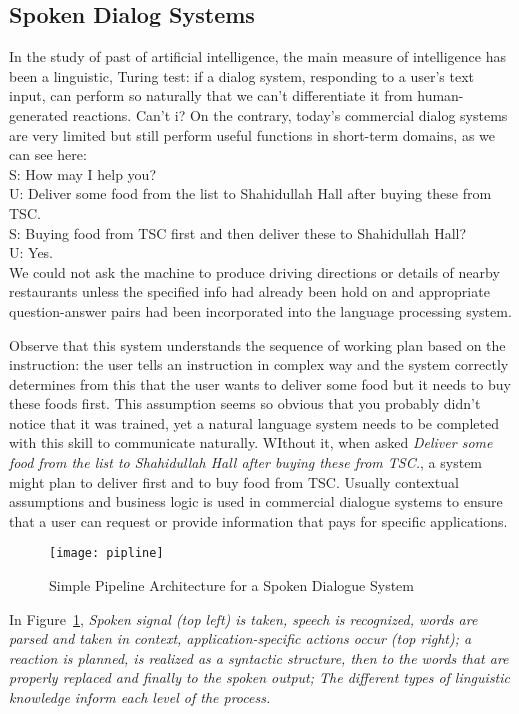 \subsection{Spoken Dialog Systems}
In the study of past of artificial intelligence, the main measure of intelligence has been a linguistic, Turing test: if a dialog system, responding to a user's text input, can perform so naturally that we can't differentiate it from human-generated reactions. Can't i? On the contrary, today's commercial dialog systems are very limited but still perform useful functions in short-term domains, as we can see here:\\
S: How may I help you?\\
U: Deliver some food from the list to Shahidullah Hall after buying these from TSC.\\
S: Buying food from TSC first and then deliver these to Shahidullah Hall?\\
U: Yes.\\

We could not ask the machine to produce driving directions or details of nearby restaurants unless the specified info had already been hold on and appropriate question-answer pairs had been incorporated into the language processing system.

Observe that this system understands the sequence of working plan based on the instruction: the user tells an instruction in complex way and the system correctly determines from this that the user wants to deliver some food but it needs to buy these foods first. This assumption seems so obvious that you probably didn't notice that it was trained, yet a natural language system needs to be completed with this skill to communicate naturally. WIthout it, when asked \emph{Deliver some food from the list to Shahidullah Hall after buying these from TSC.}, a system might plan to deliver first and to buy food from TSC.
Usually contextual assumptions and business logic is used in commercial dialogue systems to ensure that a user can request or provide information that pays for specific applications.

\begin{figure}
    \centering
    \texttt{[image: pipline]}
    \caption{Simple Pipeline Architecture for a Spoken Dialogue System\cite{NLPbook}}
    \label{fig:1}
\end{figure}

In Figure~\ref{fig:1}, \emph{Spoken signal (top left) is taken, speech is recognized, words are parsed and taken in context, application-specific actions occur (top right); a reaction is planned, is realized as a syntactic structure, then to the words that are properly replaced and finally to the spoken output; The different types of linguistic knowledge inform each level of the process.}

